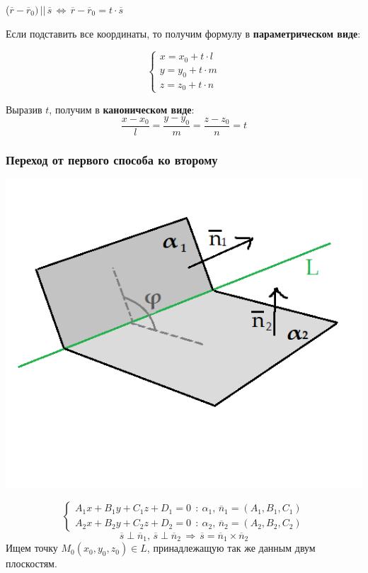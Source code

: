 \documentclass{article}
\begin{document}
($\overline{r}-\overline{r}_0)\,||\,\overline{s}\,\Leftrightarrow\,\overline{r}-\overline{r}_0=t\cdot\overline{s} $

Если подставить все координаты, то получим формулу в \textbf{параметрическом виде}:

$$ \begin{cases}x=x_0+t\cdot l\\y=y_0+t\cdot m\\z=z_0+t\cdot n \end{cases} $$

Выразив $t$, получим в \textbf{каноническом виде}:
$$ \frac{x-x_0}{l}=\frac{y-y_0}{m}=\frac{z-z_0}{n}=t $$
\newpage
\subsubsection{Переход от первого способа ко второму}
\begin{center}
    \includegraphics[scale=0.4]{pic7.png}
\end{center}
$$ \begin{cases}A_1x+B_1y+C_1z+D_1=0\:\::\:\alpha_1,\,\overline{n}_1=(A_1,B_1,C_1)\\A_2x+B_2y+C_2z+D_2=0\:\::\:\alpha_2,\,\overline{n}_2=(A_2,B_2,C_2) \end{cases}$$
$$ \overline{s}\perp\overline{n}_1,\,\overline{s}\perp\overline{n}_2\,\Rightarrow\,\overline{s}=\overline{n}_1\times\overline{n}_2 $$
Ищем точку $M_0(x_0,y_0,z_0)\in L$, принадлежащую так же данным двум плоскостям.
\end{document}
